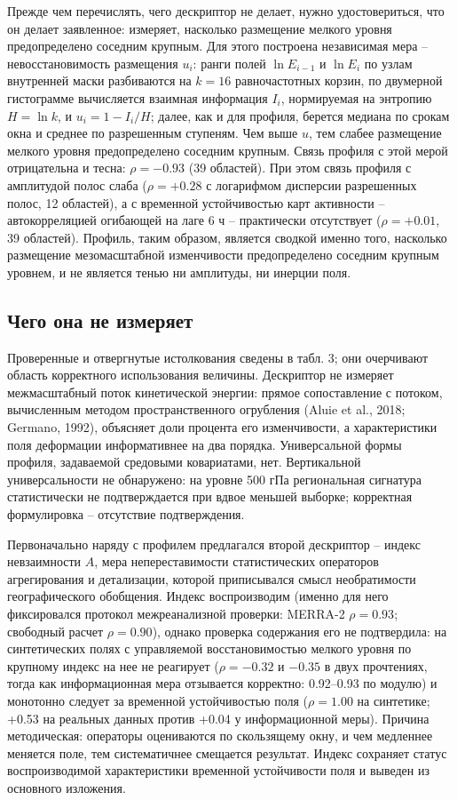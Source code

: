 \documentclass[12pt,a4paper]{article}
\begin{document}
Прежде чем перечислять, чего дескриптор не делает, нужно удостовериться, что он делает заявленное: измеряет, насколько размещение мелкого уровня предопределено соседним крупным. Для этого построена независимая мера -- невосстановимость размещения $u_i$: ранги полей $\ln E_{i-1}$ и $\ln E_i$ по узлам внутренней маски разбиваются на $k = 16$ равночастотных корзин, по двумерной гистограмме вычисляется взаимная информация $I_i$, нормируемая на энтропию $H = \ln k$, и $u_i = 1 - I_i/H$; далее, как и для профиля, берется медиана по срокам окна и среднее по разрешенным ступеням. Чем выше $u$, тем слабее размещение мелкого уровня предопределено соседним крупным. Связь профиля с этой мерой отрицательна и тесна: $\rho = -0.93$ (39 областей). При этом связь профиля с амплитудой полос слаба ($\rho = +0.28$ с логарифмом дисперсии разрешенных полос, 12 областей), а с временной устойчивостью карт активности -- автокорреляцией огибающей на лаге 6 ч -- практически отсутствует ($\rho = +0.01$, 39 областей). Профиль, таким образом, является сводкой именно того, насколько размещение мезомасштабной изменчивости предопределено соседним крупным уровнем, и не является тенью ни амплитуды, ни инерции поля.

\subsection{Чего она не измеряет}

Проверенные и отвергнутые истолкования сведены в табл. 3; они очерчивают область корректного использования величины. Дескриптор не измеряет межмасштабный поток кинетической энергии: прямое сопоставление с потоком, вычисленным методом пространственного огрубления (Aluie et al., 2018; Germano, 1992), объясняет доли процента его изменчивости, а характеристики поля деформации информативнее на два порядка. Универсальной формы профиля, задаваемой средовыми ковариатами, нет. Вертикальной универсальности не обнаружено: на уровне 500 гПа региональная сигнатура статистически не подтверждается при вдвое меньшей выборке; корректная формулировка -- отсутствие подтверждения.

Первоначально наряду с профилем предлагался второй дескриптор -- индекс невзаимности $A$, мера непереставимости статистических операторов агрегирования и детализации, которой приписывался смысл необратимости географического обобщения. Индекс воспроизводим (именно для него фиксировался протокол межреанализной проверки: MERRA-2 $\rho = 0.93$; свободный расчет $\rho = 0.90$), однако проверка содержания его не подтвердила: на синтетических полях с управляемой восстановимостью мелкого уровня по крупному индекс на нее не реагирует ($\rho = -0.32$ и $-0.35$ в двух прочтениях, тогда как информационная мера отзывается корректно: 0.92--0.93 по модулю) и монотонно следует за временной устойчивостью поля ($\rho = 1.00$ на синтетике; +0.53 на реальных данных против +0.04 у информационной меры). Причина методическая: операторы оцениваются по скользящему окну, и чем медленнее меняется поле, тем систематичнее смещается результат. Индекс сохраняет статус воспроизводимой характеристики временной устойчивости поля и выведен из основного изложения.
\end{document}
